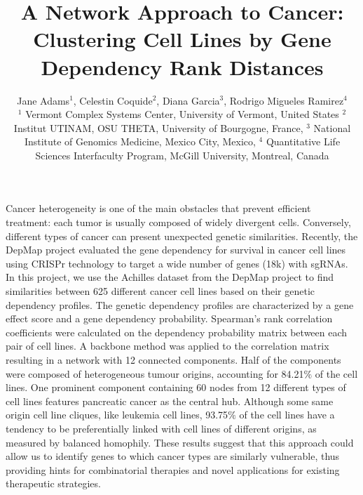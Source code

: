 \documentclass[12pt]{article}
\begin{document}
\title{\normalsize\bf \vspace{-10ex}
A Network Approach to Cancer: Clustering Cell Lines by Gene Dependency Rank Distances}

\begingroup\onehalfspacing
\author{Jane Adams$^1$, Celestin Coquide$^2$, Diana Garcia$^3$, Rodrigo Migueles Ramirez$^4$ \\
\footnotesize
$^1$ Vermont Complex Systems Center, University of Vermont, United States $^2$ Institut UTINAM, OSU THETA, University of Bourgogne, France, $^3$ National Institute of Genomics Medicine, Mexico City, Mexico,  $^4$ Quantitative Life Sciences Interfaculty Program, McGill University, Montreal, Canada }
\endgroup



\date{\vspace{-5ex}} %

\maketitle

\thispagestyle{empty}
\pagestyle{empty}
Cancer heterogeneity is one of the main obstacles that prevent efficient treatment: each tumor is usually composed of widely divergent cells. Conversely, different types of cancer can present unexpected genetic similarities. Recently, the DepMap project \cite{Tsherniak17} evaluated the gene dependency for survival in cancer cell lines using CRISPr technology to target a wide number of genes (18k) with sgRNAs. In this project, we use the Achilles dataset from the DepMap project to find similarities between 625 different cancer cell lines based on their genetic dependency profiles. The genetic dependency profiles are characterized by a gene effect score and a gene dependency probability. Spearman’s rank correlation coefficients were calculated on the dependency probability matrix between each pair of cell lines. A backbone method  \cite{Serrano09} was applied to the correlation matrix resulting in a network with 12 connected components. Half of the components were composed of heterogeneous tumour origins, accounting for 84.21$\%$ of the cell lines. One prominent component containing 60 nodes from 12 different types of cell lines features pancreatic cancer as the central hub. Although some same origin cell line cliques, like leukemia cell lines, 93.75$\%$ of the cell lines have a tendency to be preferentially linked with cell lines of different origins, as measured by balanced homophily. These results suggest that this approach could allow us to identify genes to which cancer types are similarly vulnerable, thus providing hints for combinatorial therapies and novel applications for existing therapeutic strategies. 
\end{document}
